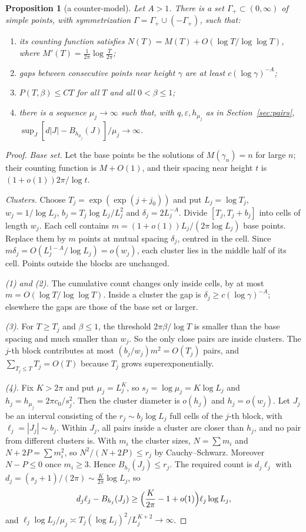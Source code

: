 \documentclass[11pt]{amsart}
\newtheorem{proposition}{Proposition}[section]
\theoremstyle{definition}
\theoremstyle{remark}
\numberwithin{equation}{section}
\begin{document}
\begin{proposition}[a counter-model]\label{prop:counter}
Let $A>1$. There is a set $\Gamma_+\subset(0,\infty)$ of simple points, with symmetrization $\Gamma=\Gamma_+\cup(-\Gamma_+)$, such that:
\begin{enumerate}
\item its counting function satisfies $N(T)=M(T)+O(\log T/\log\log T)$, where $M'(T)=\frac1{2\pi}\log\frac T{2\pi}$;
\item gaps between consecutive points near height $\gamma$ are at least $c(\log\gamma)^{-A}$;
\item $P(T,\beta)\le CT$ for all $T$ and all $0<\beta\le1$;
\item there is a sequence $\mu_j\to\infty$ such that, with $q,\varepsilon,h_{\mu_j}$ as in Section~\ref{sec:pairs}, $\sup_J[d|J|-B_{h_{\mu_j}}(J)]/\mu_j\to\infty$.
\end{enumerate}
\end{proposition}
\begin{proof}
\emph{Base set.} Let the base points be the solutions of $M(\gamma_n)=n$ for large $n$; their counting function is $M+O(1)$, and their spacing near height $t$ is $(1+o(1))2\pi/\log t$.

\emph{Clusters.} Choose $T_j=\exp(\exp(j+j_0))$ and put $L_j=\log T_j$, $w_j=1/\log L_j$, $b_j=T_j\log L_j/L_j^2$ and $\delta_j=2L_j^{-A}$. Divide $[T_j,T_j+b_j]$ into cells of length $w_j$. Each cell contains $m=(1+o(1))L_j/(2\pi\log L_j)$ base points. Replace them by $m$ points at mutual spacing $\delta_j$, centred in the cell. Since $m\delta_j=O(L_j^{1-A}/\log L_j)=o(w_j)$, each cluster lies in the middle half of its cell. Points outside the blocks are unchanged.

\emph{(1) and (2).} The cumulative count changes only inside cells, by at most $m=O(\log T/\log\log T)$. Inside a cluster the gap is $\delta_j\ge c(\log\gamma)^{-A}$; elsewhere the gaps are those of the base set or larger.

\emph{(3).} For $T\ge T_j$ and $\beta\le1$, the threshold $2\pi\beta/\log T$ is smaller than the base spacing and much smaller than $w_j$. So the only close pairs are inside clusters. The $j$-th block contributes at most $(b_j/w_j)m^2=O(T_j)$ pairs, and $\sum_{T_j\le T}T_j=O(T)$ because $T_j$ grows superexponentially.

\emph{(4).} Fix $K>2\pi$ and put $\mu_j=L_j^K$, so $s_j=\log\mu_j=K\log L_j$ and $h_j=h_{\mu_j}=2\pi c_0/s_j^2$. Then the cluster diameter is $o(h_j)$ and $h_j=o(w_j)$. Let $J_j$ be an interval consisting of the $r_j\sim b_j\log L_j$ full cells of the $j$-th block, with $\ell_j=|J_j|\sim b_j$. Within $J_j$, all pairs inside a cluster are closer than $h_j$, and no pair from different clusters is. With $m_i$ the cluster sizes, $N=\sum m_i$ and $N+2P=\sum m_i^2$, so $N^2/(N+2P)\le r_j$ by Cauchy--Schwarz. Moreover $N-P\le0$ once $m_i\ge3$. Hence $B_{h_j}(J_j)\le r_j$. The required count is $d_j\ell_j$ with $d_j=(s_j+1)/(2\pi)\sim\frac K{2\pi}\log L_j$, so
\[
d_j\ell_j-B_{h_j}(J_j)\ge\Bigl(\frac K{2\pi}-1+o(1)\Bigr)\ell_j\log L_j,
\]
and $\ell_j\log L_j/\mu_j\asymp T_j(\log L_j)^2/L_j^{K+2}\to\infty$.
\end{proof}
\end{document}
